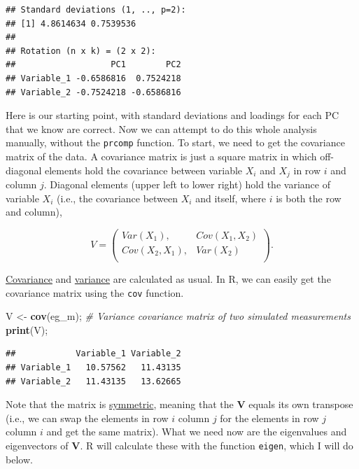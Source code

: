 \documentclass[]{article}
\newenvironment{Shaded}{\begin{snugshade}}{\end{snugshade}}
\newcommand{\CommentTok}[1]{\textcolor[rgb]{0.56,0.35,0.01}{\textit{#1}}}
\newcommand{\KeywordTok}[1]{\textcolor[rgb]{0.13,0.29,0.53}{\textbf{#1}}}
\newcommand{\NormalTok}[1]{#1}
\newcommand{\StringTok}[1]{\textcolor[rgb]{0.31,0.60,0.02}{#1}}
\begin{document}
\begin{verbatim}
## Standard deviations (1, .., p=2):
## [1] 4.8614634 0.7539536
## 
## Rotation (n x k) = (2 x 2):
##                   PC1        PC2
## Variable_1 -0.6586816  0.7524218
## Variable_2 -0.7524218 -0.6586816
\end{verbatim}

Here is our starting point, with standard deviations and loadings for
each PC that we know are correct. Now we can attempt to do this whole
analysis manually, without the \texttt{prcomp} function. To start, we
need to get the covariance matrix of the data. A covariance matrix is
just a square matrix in which off-diagonal elements hold the covariance
between variable \(X_{i}\) and \(X_{j}\) in row \(i\) and column \(j\).
Diagonal elements (upper left to lower right) hold the variance of
variable \(X_{i}\) (i.e., the covariance between \(X_{i}\) and itself,
where \(i\) is both the row and column),

\[
V = \begin{pmatrix}
  Var(X_{1}), & Cov(X_{1}, X_{2}) \\
  Cov(X_{2}, X_{1}), & Var(X_{2}) \\
\end{pmatrix}.
\]

\href{https://en.wikipedia.org/wiki/Covariance}{Covariance} and
\href{https://en.wikipedia.org/wiki/Variance}{variance} are calculated
as usual. In R, we can easily get the covariance matrix using the
\texttt{cov} function.

\begin{Shaded}
\begin{Highlighting}[]
\NormalTok{V <-}\StringTok{ }\KeywordTok{cov}\NormalTok{(eg_m); }\CommentTok{# Variance covariance matrix of two simulated measurements}
\KeywordTok{print}\NormalTok{(V);}
\end{Highlighting}
\end{Shaded}

\begin{verbatim}
##            Variable_1 Variable_2
## Variable_1   10.57562   11.43135
## Variable_2   11.43135   13.62665
\end{verbatim}

Note that the matrix is
\href{https://en.wikipedia.org/wiki/Symmetric_matrix}{symmetric},
meaning that the \(\textbf{V}\) equals its own transpose (i.e., we can
swap the elements in row \(i\) column \(j\) for the elements in row
\(j\) column \(i\) and get the same matrix). What we need now are the
eigenvalues and eigenvectors of \(\textbf{V}\). R will calculate these
with the function \texttt{eigen}, which I will do below.
\end{document}
